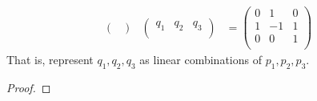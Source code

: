 \documentclass[../psets.tex]{subfiles}
\begin{document}
\begin{enumerate}
\begin{align*}
\begin{pmatrix}
        \end{pmatrix}&
        \begin{pmatrix}
            q_1 & q_2 & q_3\\
        \end{pmatrix}
        &=
        \begin{pmatrix}
            0 & 1 & 0\\
            1 & -1 & 1\\
            0 & 0 & 1\\
        \end{pmatrix}
    \end{align*}
    That is, represent $q_1,q_2,q_3$ as linear combinations of $p_1,p_2,p_3$.
    \begin{proof}



\end{proof}
\end{enumerate}
\end{document}
